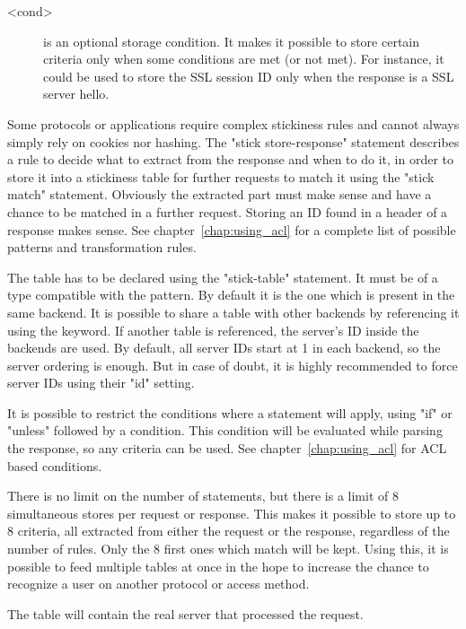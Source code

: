 {\begin{description}
  \item[<cond>] is an optional storage condition. It makes it possible to store
               certain criteria only when some conditions are met (or not met).
               For instance, it could be used to store the SSL session ID only
               when the response is a SSL server hello.
  \end{description}

  Some protocols or applications require complex stickiness rules and cannot
  always simply rely on cookies nor hashing. The "stick store-response"
  statement  describes a rule to decide what to extract from the response and
  when to do it, in order to store it into a stickiness table for further
  requests to match it using the "stick match" statement. Obviously the
  extracted part must make sense and have a chance to be matched in a further
  request. Storing an ID found in a header of a response makes sense.
  See chapter~\ref{chap:using_acl} for a complete list of possible patterns and transformation
  rules.

  The table has to be declared using the "stick-table" statement. It must be of
  a type compatible with the pattern. By default it is the one which is present
  in the same backend. It is possible to share a table with other backends by
  referencing it using the  keyword. If another table is referenced,
  the server's ID inside the backends are used. By default, all server IDs
  start at 1 in each backend, so the server ordering is enough. But in case of
  doubt, it is highly recommended to force server IDs using their "id" setting.

  It is possible to restrict the conditions where a 
  statement will apply, using "if" or "unless" followed by a condition. This
  condition will be evaluated while parsing the response, so any criteria can
  be used. See chapter~\ref{chap:using_acl} for ACL based conditions.

  There is no limit on the number of  statements, but
  there is a limit of 8 simultaneous stores per request or response. This
  makes it possible to store up to 8 criteria, all extracted from either the
  request or the response, regardless of the number of rules. Only the 8 first
  ones which match will be kept. Using this, it is possible to feed multiple
  tables at once in the hope to increase the chance to recognize a user on
  another protocol or access method.

  The table will contain the real server that processed the request.

}
